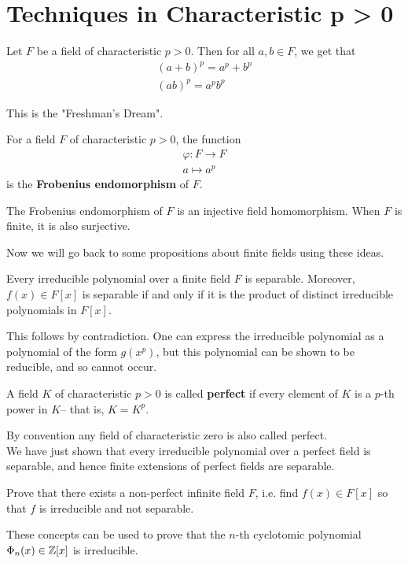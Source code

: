 \documentclass{memoir}
\begin{document}


\section{Techniques in Characteristic p > 0}
\label{sec:techniques_in_characteristic_p_0}

\begin{prop}
	Let \(F\) be a field of characteristic \(p>0\). Then for all \(a,b \in F\), we get that
	\begin{align*}
		(a+b)^{p} = a^{p} + b^{p}\\
		(ab)^{p} = a^{p}b^{p}
	\end{align*}
\end{prop}
This is the "Freshman's Dream".

\begin{defn}
	For a field \(F\) of characteristic \(p>0\), the function
	\begin{align*}
		\varphi :F\to F\\
		a\mapsto a^{p}
	\end{align*}
	is the \textbf{Frobenius endomorphism} of \(F\).
\end{defn}
\begin{cor}
	The Frobenius endomorphism of \(F\) is an injective field homomorphism. When \(F\) is finite, it is also surjective.
\end{cor}

Now we will go back to some propositions about finite fields using these ideas.
\begin{prop}
	Every irreducible polynomial over a finite field \(F\) is separable. Moreover, \(f(x) \in F[x]\) is separable if and only if it is the product of distinct irreducible polynomials in \(F[x]\).
\end{prop}
This follows by contradiction. One can express the irreducible polynomial as a polynomial of the form \(g(x^{p})\), but this polynomial can be shown to be reducible, and so cannot occur.

\begin{defn}[Perfect]
	A field \(K\) of characteristic \(p>0\) is called \textbf{perfect} if every element of \(K\) is a \(p\)-th power in \(K\)-- that is, \(K = K^{p}\).
\end{defn}
By convention any field of characteristic zero is also called perfect.\\

We have just shown that every irreducible polynomial over a perfect field is separable, and hence finite extensions of perfect fields are separable.

\begin{hw}
	Prove that there exists a non-perfect infinite field \(F\), i.e. find \(f(x) \in F[x]\) so that \(f\) is irreducible and not separable.
\end{hw}

These concepts can be used to prove that the \(n\)-th cyclotomic polynomial \(\Phi_n(x) \in \mathbb{Z}[x]\) is irreducible.
\end{document}
